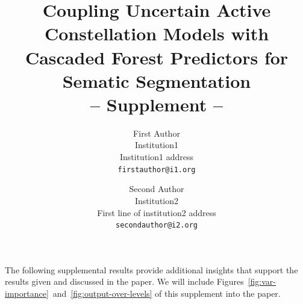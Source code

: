 \documentclass[10pt,twocolumn,letterpaper]{article}
\begin{document}
\title{Coupling Uncertain Active Constellation Models with \\
Cascaded Forest Predictors for Sematic Segmentation \\ -- Supplement --}

\author{First Author\\
Institution1\\
Institution1 address\\
{\tt\small firstauthor@i1.org}
\and
Second Author\\
Institution2\\
First line of institution2 address\\
{\tt\small secondauthor@i2.org}
}

\maketitle

The following supplemental results provide additional insights that support the results given and discussed in the paper. 
%
We will include Figures~\ref{fig:var-importance}~and~\ref{fig:output-over-levels} of this supplement into the paper. 

\end{document}
